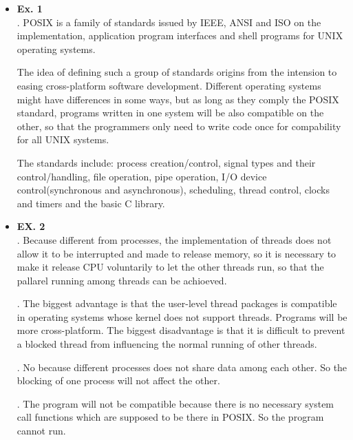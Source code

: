 \documentclass{article}
\begin{document}
\begin{itemize}
\item {\bf Ex. 1}\\
{. POSIX is a family of standards issued by IEEE, ANSI and ISO on the implementation, application program interfaces and shell programs for UNIX operating systems.}

The idea of defining such a group of standards origins from the intension to easing cross-platform software development. Different operating systems might have differences in some ways, but as long as they comply the POSIX standard, programs written in one system will be also compatible on the other, so that the programmers only need to write code once for compability for all UNIX systems.

The standards include: process creation/control, signal types and their control/handling, file operation, pipe operation, I/O device control(synchronous and asynchronous), scheduling, thread control, clocks and timers and the basic C library.\\ 


\item {\bf EX. 2}\\

{. Because different from processes, the implementation of threads does not allow it to be interrupted and made to release memory, so it is necessary to make it release CPU voluntarily to let the other threads run, so that the pallarel running among threads can be achioeved. \\}

{. The biggest advantage is that the user-level thread packages is compatible in operating systems whose kernel does not support threads. Programs will be more cross-platform. The biggest disadvantage is that it is difficult to prevent a blocked thread from influencing the normal running of other threads.\\}

{. No because different processes does not share data among each other. So the blocking of one process will not affect the other.\\}

{. The program will not be compatible because there is no necessary system call functions which are supposed to be there in POSIX. So the program cannot run.}


\end{itemize}
\end{document}
